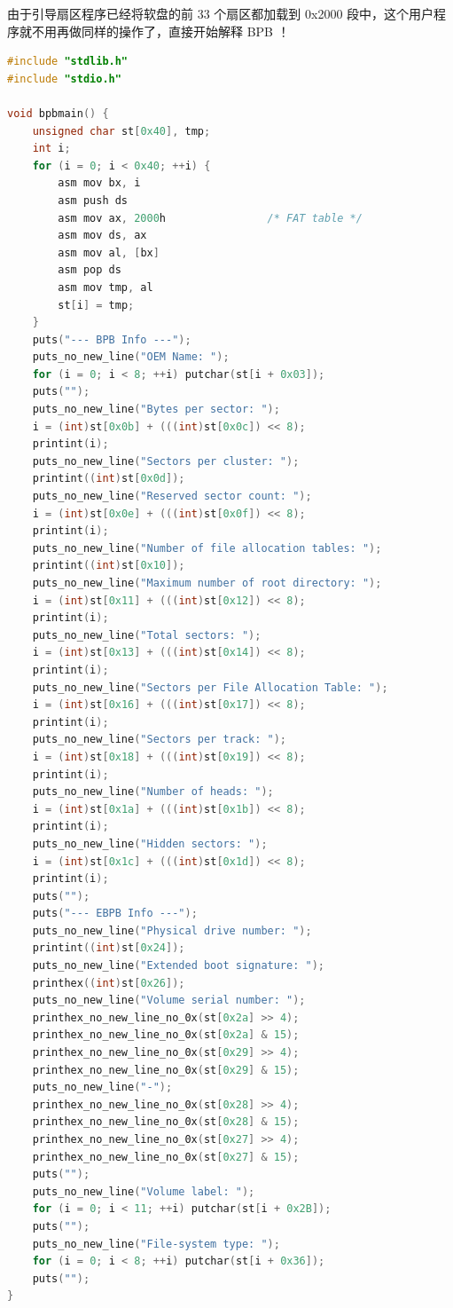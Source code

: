 \documentclass[a4paper]{article}
\begin{document}
由于引导扇区程序已经将软盘的前 33 个扇区都加载到 0x2000 段中，这个用户程序就不用再做同样的操作了，直接开始解释 BPB ！

\begin{lstlisting}[language=C]
#include "stdlib.h"
#include "stdio.h"

void bpbmain() {
	unsigned char st[0x40], tmp;
	int i;
	for (i = 0; i < 0x40; ++i) {
		asm mov bx, i
		asm push ds
		asm mov ax, 2000h                /* FAT table */
		asm mov ds, ax
		asm mov al, [bx]
		asm pop ds
		asm mov tmp, al
		st[i] = tmp;
	}
	puts("--- BPB Info ---");
	puts_no_new_line("OEM Name: ");
	for (i = 0; i < 8; ++i) putchar(st[i + 0x03]);
	puts("");
	puts_no_new_line("Bytes per sector: ");
	i = (int)st[0x0b] + (((int)st[0x0c]) << 8);
	printint(i);
	puts_no_new_line("Sectors per cluster: ");
	printint((int)st[0x0d]);
	puts_no_new_line("Reserved sector count: ");
	i = (int)st[0x0e] + (((int)st[0x0f]) << 8);
	printint(i);
	puts_no_new_line("Number of file allocation tables: ");
	printint((int)st[0x10]);
	puts_no_new_line("Maximum number of root directory: ");
	i = (int)st[0x11] + (((int)st[0x12]) << 8);
	printint(i);
	puts_no_new_line("Total sectors: ");
	i = (int)st[0x13] + (((int)st[0x14]) << 8);
	printint(i);
	puts_no_new_line("Sectors per File Allocation Table: ");
	i = (int)st[0x16] + (((int)st[0x17]) << 8);
	printint(i);
	puts_no_new_line("Sectors per track: ");
	i = (int)st[0x18] + (((int)st[0x19]) << 8);
	printint(i);
	puts_no_new_line("Number of heads: ");
	i = (int)st[0x1a] + (((int)st[0x1b]) << 8);
	printint(i);
	puts_no_new_line("Hidden sectors: ");
	i = (int)st[0x1c] + (((int)st[0x1d]) << 8);
	printint(i);
	puts("");
	puts("--- EBPB Info ---");
	puts_no_new_line("Physical drive number: ");
	printint((int)st[0x24]);
	puts_no_new_line("Extended boot signature: ");
	printhex((int)st[0x26]);
	puts_no_new_line("Volume serial number: ");
	printhex_no_new_line_no_0x(st[0x2a] >> 4);
	printhex_no_new_line_no_0x(st[0x2a] & 15);
	printhex_no_new_line_no_0x(st[0x29] >> 4);
	printhex_no_new_line_no_0x(st[0x29] & 15);
	puts_no_new_line("-");
	printhex_no_new_line_no_0x(st[0x28] >> 4);
	printhex_no_new_line_no_0x(st[0x28] & 15);
	printhex_no_new_line_no_0x(st[0x27] >> 4);
	printhex_no_new_line_no_0x(st[0x27] & 15);
	puts("");
	puts_no_new_line("Volume label: ");
	for (i = 0; i < 11; ++i) putchar(st[i + 0x2B]);
	puts("");
	puts_no_new_line("File-system type: ");
	for (i = 0; i < 8; ++i) putchar(st[i + 0x36]);
	puts("");
}
\end{lstlisting}

\newpage
\end{document}
